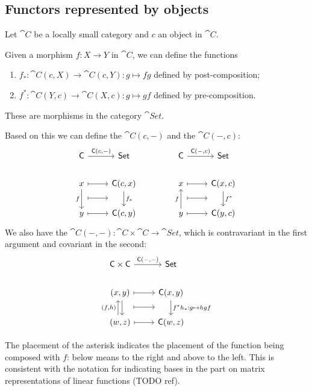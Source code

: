 \subsection{Functors represented by objects}
\begin{definition}
Let $\cat{C}$ be a locally small category and $c$ an object in $\cat{C}$.

Given a morphism $f: X\to Y$ in $\cat{C}$, we can define the functions
\begin{enumerate}
\item $f_*: \cat{C}(c,X) \to \cat{C}(c,Y): g\mapsto fg$ defined by post-composition;
\item $f^*: \cat{C}(Y,c) \to \cat{C}(X,c): g\mapsto gf$ defined by pre-composition.
\end{enumerate}
These are morphisms in the category $\cat{Set}$.

Based on this we can define the  $\cat{C}(c,-)$ and the  $\cat{C}(-,c)$:
\[ \begin{tikzcd}
\cat{C} \ar[r, "{\cat{C}(c,-)}"] & \cat{Set} \\
x \ar[d, swap, "f"]\ar[r, mapsto] \ar[r,mapsto, shift right=1.7em] & \cat{C}(c,x) \ar[d, "f_*"] \\
y \ar[r,mapsto] & \cat{C}(c,y)
\end{tikzcd} \qquad\qquad \begin{tikzcd}
\cat{C} \ar[r, "{\cat{C}(-,c)}"] & \cat{Set} \\
x \ar[r, mapsto] \ar[r,mapsto, shift right=1.7em] & \cat{C}(x,c) \ar[d, "f^*"] \\
y \ar[u, "f"] \ar[r,mapsto] & \cat{C}(y,c) 
\end{tikzcd} \]
We also have the  $\cat{C}(-,-):\cat{C}\times \cat{C} \to \cat{Set}$, which is contravariant in the first argument and covariant in the second:
\[ \begin{tikzcd}
\cat{C}\times\cat{C} \ar[r, "{\cat{C}(-,-)}"] & \cat{Set} \\
(x,y) \ar[d, shift left]\ar[r, mapsto] \ar[r,mapsto, shift right=1.7em] & \cat{C}(x,y) \ar[d, "{f^*h_*: g\mapsto hgf}"] \\
(w,z) \ar[u, shift left, "{(f,h)}"] \ar[r,mapsto] & \cat{C}(w,z)
\end{tikzcd} \]
\end{definition}
The placement of the asterisk indicates the placement of the function being composed with $f$: below means to the right and above to the left. This is consistent with the notation for indicating bases in the part on matrix representations of linear functions (TODO ref).

